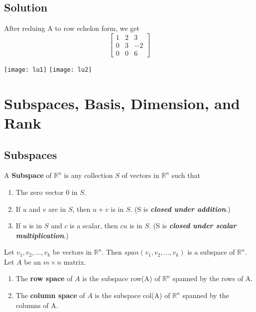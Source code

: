 \subsection*{Solution}
After reduing A to row echelon form, we get
$$\begin{bmatrix}
    1&2&3\\0&3&-2\\0&0&6
\end{bmatrix}$$

\texttt{[image: lu1]}
\texttt{[image: lu2]}

\section{Subspaces, Basis, Dimension, and Rank}
\subsection*{Subspaces}
A \textbf{Subspace} of $\mathbb{R}^n$ is any collection $S$ of vectors in $\mathbb{R}^n$ such that
\begin{enumerate}
    \item The zero vector 0 in $S$.
    \item If $u$ and $v$ are in $S$, then $u+v$ is in $S$. (S is \textbf{\textit{closed under addition}}.)
    \item If $u$ is in $S$ and $c$ is a scalar, then $cu$ is in $S$. (S is \textbf{\textit{closed under scalar multiplication}}.)
\end{enumerate}
Let $v_1, v_2, \dots, v_k$ be vectors in $\mathbb{R}^n$. Then $span(v_1, v_2, \dots, v_k)$ is a subspace of $\mathbb{R}^n$.\\
Let $A$ be an $m\times n$ matrix. \begin{enumerate}
    \item The \textbf{row space} of $A$ is the subspace row(A) of $\mathbb{R}^n$ spanned by the rows of A. 
    \item The \textbf{column space} of $A$ is the subspace col(A) of $\mathbb{R}^n$ spanned by the columns of A. 
\end{enumerate}

